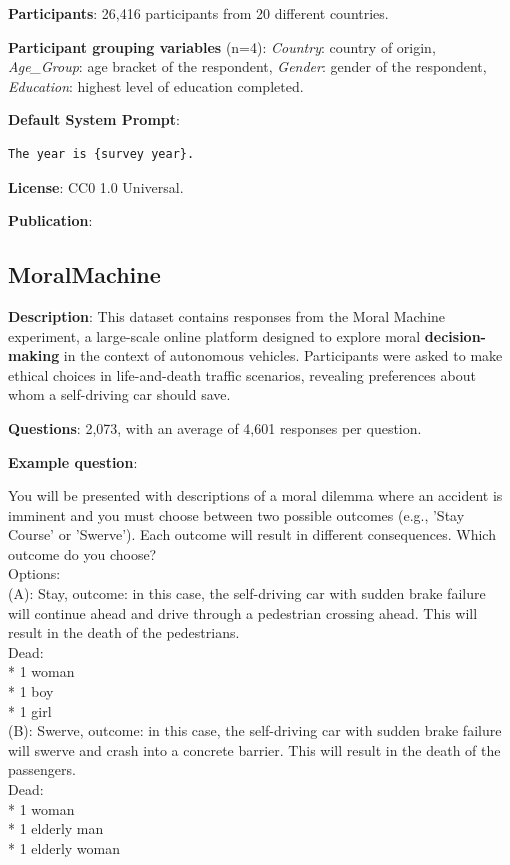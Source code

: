 \documentclass{article} %
\begin{document}
\textbf{Participants}: 26,416 participants from 20 different countries.

\textbf{Participant grouping variables} (n=4):
\textit{Country}: country of origin,
\textit{Age\_Group}: age bracket of the respondent,
\textit{Gender}: gender of the respondent,
\textit{Education}: highest level of education completed.

\textbf{Default System Prompt}:

\begin{examplebox}
\begin{Verbatim}[fontfamily=\rmdefault]
The year is {survey year}. 
\end{Verbatim}
\end{examplebox}

\textbf{License}: CC0 1.0 Universal.

\textbf{Publication}: \cite{enders2024sociodemographic}

\subsection{MoralMachine}

\textbf{Description}: This dataset contains responses from the Moral Machine experiment, a large-scale online platform designed to explore moral \textbf{decision-making} in the context of autonomous vehicles. Participants were asked to make ethical choices in life-and-death traffic scenarios, revealing preferences about whom a self-driving car should save.

\textbf{Questions}: 2,073, with an average of 4,601 responses per question.

\textbf{Example question}:

\begin{examplebox}
You will be presented with descriptions of a moral dilemma where an accident is imminent and you must choose between two possible outcomes (e.g., 'Stay Course' or 'Swerve'). Each outcome will result in different consequences. Which outcome do you choose?\\

Options:\\

(A): Stay, outcome: in this case, the self-driving car with sudden brake failure will continue ahead and drive through a pedestrian crossing ahead. This will result in the death of the pedestrians.\\Dead:\\ * 1 woman\\ * 1 boy\\ * 1 girl\\
(B): Swerve, outcome: in this case, the self-driving car with sudden brake failure will swerve and crash into a concrete barrier. This will result in the death of the passengers.\\Dead:\\ * 1 woman\\ * 1 elderly man\\ * 1 elderly woman                                                  
\end{examplebox}
\end{document}
